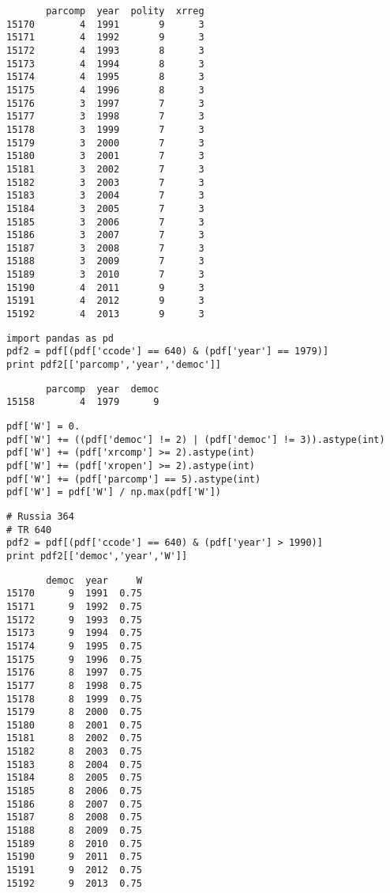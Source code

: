 \documentclass[12pt,fleqn]{article}\usepackage{common}
\begin{document}
\begin{verbatim}
       parcomp  year  polity  xrreg
15170        4  1991       9      3
15171        4  1992       9      3
15172        4  1993       8      3
15173        4  1994       8      3
15174        4  1995       8      3
15175        4  1996       8      3
15176        3  1997       7      3
15177        3  1998       7      3
15178        3  1999       7      3
15179        3  2000       7      3
15180        3  2001       7      3
15181        3  2002       7      3
15182        3  2003       7      3
15183        3  2004       7      3
15184        3  2005       7      3
15185        3  2006       7      3
15186        3  2007       7      3
15187        3  2008       7      3
15188        3  2009       7      3
15189        3  2010       7      3
15190        4  2011       9      3
15191        4  2012       9      3
15192        4  2013       9      3
\end{verbatim}


\begin{verbatim}
import pandas as pd
pdf2 = pdf[(pdf['ccode'] == 640) & (pdf['year'] == 1979)]
print pdf2[['parcomp','year','democ']]
\end{verbatim}

\begin{verbatim}
       parcomp  year  democ
15158        4  1979      9
\end{verbatim}


\begin{verbatim}
pdf['W'] = 0.
pdf['W'] += ((pdf['democ'] != 2) | (pdf['democ'] != 3)).astype(int)
pdf['W'] += (pdf['xrcomp'] >= 2).astype(int)
pdf['W'] += (pdf['xropen'] >= 2).astype(int)
pdf['W'] += (pdf['parcomp'] == 5).astype(int)
pdf['W'] = pdf['W'] / np.max(pdf['W'])
\end{verbatim}

\begin{verbatim}
# Russia 364
# TR 640
pdf2 = pdf[(pdf['ccode'] == 640) & (pdf['year'] > 1990)]
print pdf2[['democ','year','W']]
\end{verbatim}

\begin{verbatim}
       democ  year     W
15170      9  1991  0.75
15171      9  1992  0.75
15172      9  1993  0.75
15173      9  1994  0.75
15174      9  1995  0.75
15175      9  1996  0.75
15176      8  1997  0.75
15177      8  1998  0.75
15178      8  1999  0.75
15179      8  2000  0.75
15180      8  2001  0.75
15181      8  2002  0.75
15182      8  2003  0.75
15183      8  2004  0.75
15184      8  2005  0.75
15185      8  2006  0.75
15186      8  2007  0.75
15187      8  2008  0.75
15188      8  2009  0.75
15189      8  2010  0.75
15190      9  2011  0.75
15191      9  2012  0.75
15192      9  2013  0.75
\end{verbatim}
\end{document}
